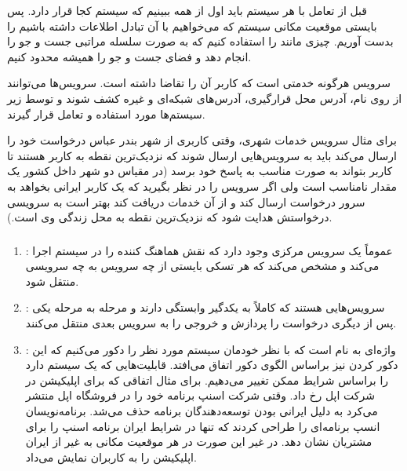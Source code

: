 قبل از تعامل با هر سیستم باید اول از همه ببینیم که سیستم کجا قرار دارد. پس
بایستی موقعیت مکانی سیستم که می‌خواهیم با آن تبادل اطلاعات داشته باشیم را بدست
آوریم. چیزی مانند  را استفاده کنیم که به صورت سلسله مراتبی جست و جو را
انجام دهد و فضای جست و جو را همیشه محدود کنیم.

سرویس هرگونه خدمتی است که کاربر آن را تقاضا داشته است. سرویس‌ها می‌توانند از روی
نام، آدرس محل قرارگیری، آدرس‌های شبکه‌ای و غیره کشف شوند و توسط زیر سیستم‌ها
مورد استفاده و تعامل قرار گیرند.

برای مثال سرویس خدمات شهری، وقتی کاربری از شهر بندر عباس درخواست خود را ارسال
می‌کند باید به سرویس‌هایی ارسال شوند که نزدیک‌ترین نقطه به کاربر هستند تا کاربر
بتواند به صورت مناسب به پاسخ خود برسد (در مقیاس دو شهر داخل کشور یک مقدار
نامناسب است ولی اگر سرویس  را در نظر بگیرید که یک کاربر ایرانی
بخواهد به سرور  درخواست ارسال کند و از آن خدمات دریافت کند بهتر است به
سرویسی درخواستش هدایت شود که نزدیک‌ترین نقطه به محل زندگی وی است.).

\subsubsection{}

\begin{enumerate}
    \item {}: عموماً یک سرویس مرکزی وجود دارد که نقش هماهنگ
    کننده را در سیستم اجرا می‌کند و مشخص می‌کند که هر تسکی بایستی از چه سرویس به
    چه سرویسی منتقل شود.
    \item {}: سرویس‌هایی هستند که کاملاً به یکدگیر وابستگی دارند
    و مرحله به مرحله یکی پس از دیگری درخواست را پردازش و خروجی را به سرویس بعدی
    منتقل می‌کنند.
    \item {}: واژه‌ای به نام  است که با نظر
    خودمان سیستم مورد نظر را دکور می‌کنیم که این دکور کردن نیز براساس الگوی دکور
    اتفاق می‌افتد. قابلیت‌هایی که یک سیستم دارد را براساس شرایط ممکن تغییر
    می‌دهیم. برای مثال اتفاقی که برای اپلیکیشن  در  شرکت
    اپل رخ داد. وقتی شرکت اسنپ برنامه  خود را در فروشگاه اپل منتشر
    می‌کرد به دلیل ایرانی بودن توسعه‌دهندگان برنامه حذف می‌شد. برنامه‌نویسان
    انسپ برنامه‌ای را طراحی کردند که تنها در شرایط  ایران برنامه اسنپ را
    برای مشتریان نشان دهد. در غیر این صورت در هر موقعیت مکانی به غیر از ایران
    اپلیکیشن  را به کاربران نمایش می‌داد.
\end{enumerate}

